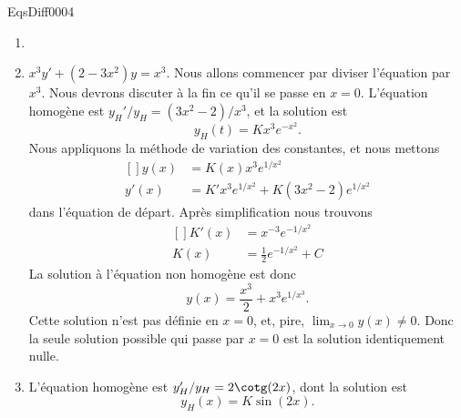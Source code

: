 \begin{corrige}{EqsDiff0004}
\begin{enumerate}
\item
\item
$x^3y'+(2-3x^2)y=x^3$. Nous allons commencer par diviser l'équation par $x^3$. Nous devrons discuter à la fin ce qu'il se passe en $x=0$. L'équation homogène est $y_H'/y_H=(3x^2-2)/x^3$, et la solution est
\begin{equation}
	y_H(t)=Kx^3 e^{-x^2}.
\end{equation}
Nous appliquons la méthode de variation des constantes, et nous mettons
\begin{equation}
	\begin{aligned}[]
		y(x)&=K(x)x^3 e^{1/x^2}\\
		y'(x)&=K'x^3 e^{1/x^2}+K(3x^2-2) e^{1/x^2}
	\end{aligned}
\end{equation}
dans l'équation de départ. Après simplification nous trouvons
\begin{equation}
	\begin{aligned}[]
		K'(x)&=x^{-3} e^{-1/x^2}\\
		K(x)&=\frac{ 1 }{2} e^{-1/x^2}+C
	\end{aligned}
\end{equation}
La solution à l'équation non homogène est donc
\begin{equation}
	y(x)=\frac{ x^3 }{2}+x^3 e^{1/x^3}.
\end{equation}
Cette solution n'est pas définie en $x=0$, et, pire, $\lim_{x\to 0} y(x)\neq 0$. Donc la seule solution possible qui passe par $x=0$ est la solution identiquement nulle.
	
\item
L'équation homogène est $y'_H/y_H=2\cotg(2x)$, dont la solution est
\begin{equation}
	y_H(x)=K\sin(2x).
\end{equation}
\end{enumerate}

\end{corrige}
